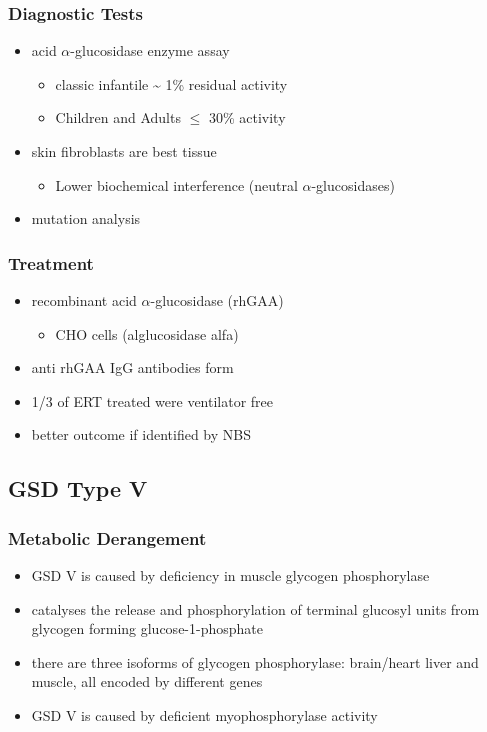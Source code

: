 \documentclass{scrartcl}
\begin{document}
\subsubsection{Diagnostic Tests}
\label{sec:orgae3172b}
\begin{itemize}
\item acid \(\alpha\)-glucosidase enzyme assay
\begin{itemize}
\item classic infantile \textasciitilde{} 1\% residual activity
\item Children and Adults \(\le\) 30\% activity
\end{itemize}
\item skin fibroblasts are best tissue
\begin{itemize}
\item Lower biochemical interference (neutral \(\alpha\)-glucosidases)
\end{itemize}
\item mutation analysis
\end{itemize}
\subsubsection{Treatment}
\label{sec:org98eeaf7}
\begin{itemize}
\item recombinant acid \(\alpha\)-glucosidase (rhGAA)
\begin{itemize}
\item CHO cells (alglucosidase alfa)
\end{itemize}
\item anti rhGAA IgG antibodies form
\item 1/3 of ERT treated were ventilator free
\item better outcome if identified by NBS
\end{itemize}

\subsection{GSD Type V}
\label{sec:org308a3c9}
\subsubsection{Metabolic Derangement}
\label{sec:orgd19024c}
\begin{itemize}
\item GSD V is caused by deficiency in muscle glycogen phosphorylase
\item catalyses the release and phosphorylation of terminal glucosyl units
from glycogen forming glucose-1-phosphate
\item there are three isoforms of glycogen phosphorylase: brain/heart
liver and muscle, all encoded by different genes
\item GSD V is caused by deficient myophosphorylase activity
\end{itemize}
\end{document}
